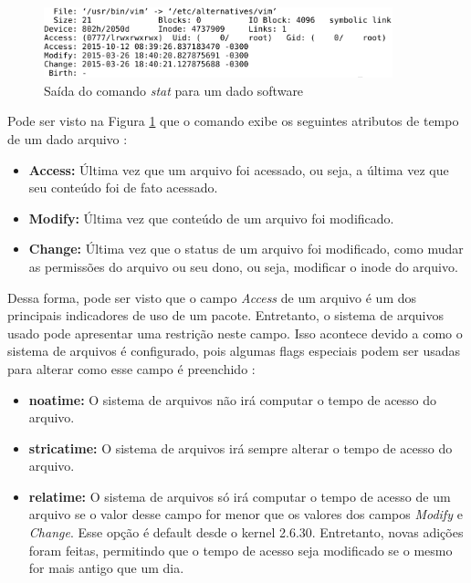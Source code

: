 \begin{figure}[h]
  \centering
  \includegraphics[width=0.9\textwidth]{figuras/comando_stat.eps}
  \caption{Saída do comando \textit{stat} para um dado software}
  \label{fig:comando_stat}
\end{figure}

Pode ser visto na Figura \ref{fig:comando_stat} que o comando exibe os seguintes
atributos de tempo de um dado arquivo \cite{1_haas}:

\begin{itemize}
    \item \textbf{Access:} Última vez que um arquivo foi acessado, ou seja, a
        última vez que seu conteúdo foi de fato acessado.
    \item \textbf{Modify:} Última vez que conteúdo de um arquivo foi modificado.
    \item \textbf{Change:} Última vez que o status de um arquivo foi modificado,
        como mudar as permissões do arquivo ou seu dono, ou seja, modificar o
        inode do arquivo.
\end{itemize}

Dessa forma, pode ser visto que o campo \textit{Access} de um arquivo é um dos
principais indicadores de uso de um pacote. Entretanto, o sistema de arquivos
usado pode apresentar uma
restrição neste campo. Isso acontece devido a como o sistema de arquivos é
configurado, pois algumas flags especiais podem ser usadas para alterar como
esse campo é preenchido \cite{2_wiki.debian.org}:

\begin{itemize}
    \item \textbf{noatime:} O sistema de arquivos não irá computar o tempo de
        acesso do arquivo.
    \item \textbf{stricatime:} O sistema de arquivos irá sempre alterar o tempo
        de acesso do arquivo.
    \item \textbf{relatime:} O sistema de arquivos só irá computar o tempo de
        acesso de um arquivo se o valor desse campo for menor que os valores dos
        campos \textit{Modify} e \textit{Change}. Esse opção é default desde
        o kernel 2.6.30. Entretanto, novas adições foram feitas, permitindo que
        o tempo de acesso seja modificado se o mesmo for mais antigo que um dia.
\end{itemize}

